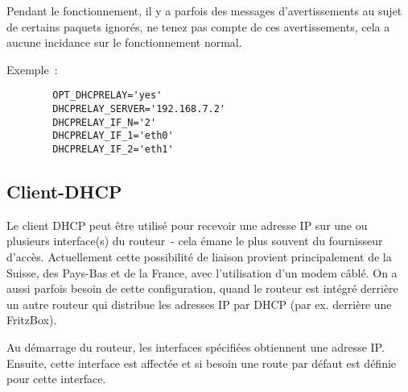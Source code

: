 \begin{description}
    Pendant le fonctionnement, il y a parfois des messages d'avertissements
    au sujet de certains paquets ignorés, ne tenez pas compte de ces avertissements,
    cela a aucune incidance sur le fonctionnement normal.

   Exemple~:

\begin{example}
\begin{verbatim}
        OPT_DHCPRELAY='yes'
        DHCPRELAY_SERVER='192.168.7.2'
        DHCPRELAY_IF_N='2'
        DHCPRELAY_IF_1='eth0'
        DHCPRELAY_IF_2='eth1'
\end{verbatim}
\end{example}
\end{description}

{
\subsection {Client-DHCP}
}

Le client DHCP peut être utilisé pour recevoir une adresse IP sur une ou
plusieurs interface(s) du routeur~- cela émane le plus souvent du fournisseur
d'accès. Actuellement cette possibilité de liaison provient principalement de
la Suisse, des Pays-Bas et de la France, avec l'utilisation d'un modem câblé.
On a aussi parfois besoin de cette configuration, quand le routeur est intégré
derrière un autre routeur qui distribue les adresses IP par DHCP (par ex.
derrière une FritzBox).

Au démarrage du routeur, les interfaces spécifiées obtiennent une adresse IP.
Ensuite, cette interface est affectée et si besoin une route par défaut est
définie pour cette interface.

